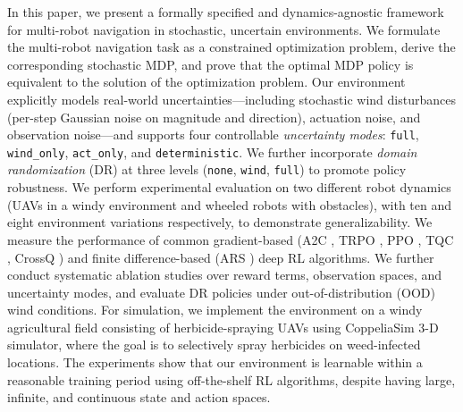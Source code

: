 \documentclass[letterpaper, 10 pt, conference]{ieeeconf}  %
\begin{document}
In this paper, we present a formally specified and dynamics-agnostic framework for multi-robot navigation in stochastic, uncertain environments. We formulate the multi-robot navigation task as a constrained optimization problem, derive the corresponding stochastic MDP, and prove that the optimal MDP policy is equivalent to the solution of the optimization problem. Our environment explicitly models real-world uncertainties—including stochastic wind disturbances (per-step Gaussian noise on magnitude and direction), actuation noise, and observation noise—and supports four controllable \emph{uncertainty modes}: \texttt{full}, \texttt{wind\_only}, \texttt{act\_only}, and \texttt{deterministic}. We further incorporate \emph{domain randomization} (DR) at three levels (\texttt{none}, \texttt{wind}, \texttt{full}) to promote policy robustness. We perform experimental evaluation on two different robot dynamics (UAVs in a windy environment and wheeled robots with obstacles), with ten and eight environment variations respectively, to demonstrate generalizability. We measure the performance of common gradient-based (A2C \cite{mnih2016a2c}, TRPO \cite{schulman2015trust}, PPO \cite{schulman2017ppo}, TQC \cite{kuznetsov2020tqc}, CrossQ \cite{bhatt2024crossq}) and finite difference-based (ARS \cite{mania2018ars}) deep RL algorithms. We further conduct systematic ablation studies over reward terms, observation spaces, and uncertainty modes, and evaluate DR policies under out-of-distribution (OOD) wind conditions. For simulation, we implement the environment on a windy agricultural field consisting of herbicide-spraying UAVs using CoppeliaSim \cite{coppeliaSim2013} 3-D simulator, where the goal is to selectively spray herbicides on weed-infected locations. The experiments show that our environment is learnable within a reasonable training period using off-the-shelf RL algorithms, despite having large, infinite, and continuous state and action spaces.
\end{document}
